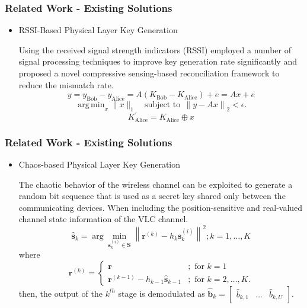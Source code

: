 \documentclass{beamer}
\begin{document}
\begin{frame}
  \frametitle{Related Work - Existing Solutions}
  \begin{itemize}
    \item RSSI-Based Physical Layer Key Generation\cite{10.1145/1614320.1614356}\cite{8580375}
    
    Using the received signal strength indicators (RSSI) employed a number of signal processing techniques to improve key generation rate significantly and proposed a novel compressive sensing-based reconciliation framework to reduce the mismatch rate\cite{8580375}. 
\begin{equation} y = y_{\mathrm{ Bob}}-y_{\mathrm{ Alice}}= A \left ({K_{\mathrm{ Bob}}-K_{\mathrm{ Alice}}}\right) + e= A x +e \end{equation} 
\begin{equation} \mathop {\mathrm {arg\,min}} _{x} \| x \|_{1} \quad \text {subject to}~ ~\left \|{y - Ax}\right \|_{2} < \epsilon.\end{equation} 
\begin{equation}K_{\mathrm{ Alice}}^{'} = K_{\mathrm{ Alice}} \oplus x\end{equation} 
\end{itemize}
\end{frame}

\begin{frame}
  \frametitle{Related Work - Existing Solutions}
  \begin{itemize}
    \item Chaos-based Physical Layer Key Generation\cite{https://doi.org/10.1049/iet-opt.2018.5072}
    
    The chaotic behavior of the wireless channel can be exploited to generate a random bit sequence that is used as a secret key shared only between the communicating devices. When including the position-sensitive and real-valued channel state information of the VLC channel. 
    \begin{equation}{\widehat {\mathbf{s}}_k} = \arg \mathop {\min }\limits_{{\mathbf{s}}_k^{(i)} \in {\mathbf{S}}} {\left\| {{{\mathbf{r}}^{(k)}} - {h_k}{\mathbf{s}}_k^{(i)}} \right\|^2};k = 1, \ldots ,K\end{equation}
    where
    \begin{equation}{{\mathbf{r}}^{(k)}} = \begin{cases} {\mathbf{r}}&{;{\text{ for }}k = 1} \\ {{{\mathbf{r}}^{(k - 1)}} - {h_{k - 1}}{{\widehat {\mathbf{s}}}_{k - 1}}}&{;{\text{ for }}k = 2, \ldots ,K.} \end{cases}\end{equation}
    then, the output of the \(k^{th}\) stage is demodulated as \({{\hat{\mathbf b}}_k} = \left[ {\begin{array}{lll} {{{\hat b}_{k,1}}}& \ldots &{{{\hat b}_{k,U}}} \end{array}} \right]\).
\end{itemize}
\end{frame}
\end{document}

